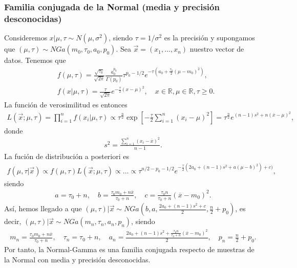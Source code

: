 \subsubsection{Familia conjugada de la Normal (media y precisión desconocidas)}
\noindent Consideremos $x | \mu,\tau \sim N(\mu,\sigma^2)$, siendo $\tau = 1/\sigma^2 $ es la precisión y supongamos que $(\mu,\tau) \sim NGa(m_0,\tau_0,a_0,p_0)$. Sea $\vec{x} = (x_1,\ldots,x_n)$ nuestro vector de datos. Tenemos que
\begin{align*}
    &f(\mu,\tau) = \frac{\sqrt{\tau_0}}{\sqrt{2\pi}} \frac{a_0^{p_0}}{\Gamma(p_0)} \tau^{p_0 - 1/2} e^{-\tau\left( a_0 + \frac{\tau_0}{2}(\mu - m_0)^2 \right)}, \\
    &f(x | \mu, \tau) = \frac{\tau}{\sqrt{2\pi}} e^{-\frac{\tau}{2}(x-\mu)^2}, \quad x \in \mathbb{R}, \mu \in \mathbb{R}, \tau \ge 0.
\end{align*}
La función de verosimilitud es entonces
\begin{align*}
    L(\vec{x};\mu,\tau) = \prod_{i=1}^{n}f(x_i | \mu, \tau) \propto \tau^{\frac{n}{2}}\exp\left[ - \frac{\tau}{2} \sum_{i=1}^{n} (x_i - \mu)^2\right] 
     = \tau^{\frac{n}{2}} e^{ (n-1)s^2 + n(\overline{x} -\mu)^2 },
\end{align*}
donde 
\begin{align*}
    s^2 = \frac{\sum_{i=1}^{n} (x_i - \overline{x})^2}{n-1}.
\end{align*}
La fución de distribución a posteriori es
\begin{align*}
    f(\mu,\tau | \vec{x}) \propto f(\mu,\tau) L(\vec{x};\mu,\tau) \propto \ldots \propto \tau^{n/2 - p_0 - 1/2} e^{-\frac{\tau}{2}(2a_0 + (n-1)s^2 + a(\mu - b)^2) + c)},
\end{align*}
siendo 
\begin{align*}
    a = \tau_0 + n, \quad b = \frac{\tau_0 m_0 + n \overline{x}}{\tau_0 + n}, \quad c = \frac{\tau_0n}{\tau_0 + n}(\overline{x} - m_0)^2.
\end{align*}
Así, hemos llegado a que $(\mu,\tau) | \vec{x} \sim NGa \left(b, a, \frac{2a_0 + (n-1)s^2 + c}{2}, \frac{n}{2} + p_0 \right)$, es decir, $(\mu,\tau) | \vec{x} \sim NGa(m_n, \tau_n, a_n,p_n)$, siendo
\begin{align*}
    m_n = \frac{\tau_0 m_0 + n \overline{x}}{\tau_0 + n}, \quad \tau_n = \tau_0 + n, \quad a_n = \frac{2a_0 + (n-1)s^2 + \frac{\tau_0n}{\tau_0 + n}(\overline{x} - m_0)^2}{2}, \quad p_n = \frac{n}{2} + p_0.
\end{align*}
Por tanto, la Normal-Gamma es una familia conjugada respecto de muestras de la Normal con media y precisión desconocidas.


